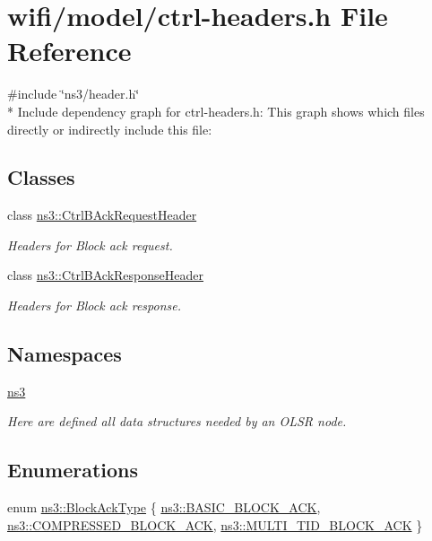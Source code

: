 \hypertarget{ctrl-headers_8h}{}\section{wifi/model/ctrl-\/headers.h File Reference}
\label{ctrl-headers_8h}
{\ttfamily \#include \char`\"{}ns3/header.\+h\char`\"{}}\\*
Include dependency graph for ctrl-\/headers.h\+:
This graph shows which files directly or indirectly include this file\+:
\subsection*{Classes}
\begin{DoxyCompactItemize}
\item 
class \hyperlink{classns3_1_1CtrlBAckRequestHeader}{ns3\+::\+Ctrl\+B\+Ack\+Request\+Header}
\begin{DoxyCompactList}\small\item\em Headers for Block ack request. \end{DoxyCompactList}\item 
class \hyperlink{classns3_1_1CtrlBAckResponseHeader}{ns3\+::\+Ctrl\+B\+Ack\+Response\+Header}
\begin{DoxyCompactList}\small\item\em Headers for Block ack response. \end{DoxyCompactList}\end{DoxyCompactItemize}
\subsection*{Namespaces}
\begin{DoxyCompactItemize}
\item 
 \hyperlink{namespacens3}{ns3}
\begin{DoxyCompactList}\small\item\em Here are defined all data structures needed by an O\+L\+SR node. \end{DoxyCompactList}\end{DoxyCompactItemize}
\subsection*{Enumerations}
\begin{DoxyCompactItemize}
\item 
enum \hyperlink{namespacens3_a90f436472d19d7d7f37cbf0b8c288ff7}{ns3\+::\+Block\+Ack\+Type} \{ \hyperlink{namespacens3_a90f436472d19d7d7f37cbf0b8c288ff7a118b16b614e89a911b77a167632f89bf}{ns3\+::\+B\+A\+S\+I\+C\+\_\+\+B\+L\+O\+C\+K\+\_\+\+A\+CK}, 
\hyperlink{namespacens3_a90f436472d19d7d7f37cbf0b8c288ff7ad325114ff6e0d84c1d4cea5bd810a48c}{ns3\+::\+C\+O\+M\+P\+R\+E\+S\+S\+E\+D\+\_\+\+B\+L\+O\+C\+K\+\_\+\+A\+CK}, 
\hyperlink{namespacens3_a90f436472d19d7d7f37cbf0b8c288ff7a2b0db78cd77aa4769690b7b6aac6f017}{ns3\+::\+M\+U\+L\+T\+I\+\_\+\+T\+I\+D\+\_\+\+B\+L\+O\+C\+K\+\_\+\+A\+CK}
 \}
\end{DoxyCompactItemize}
